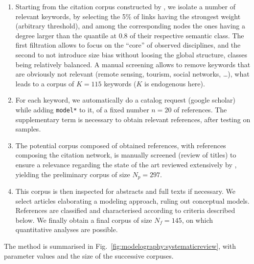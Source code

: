 \documentclass[10pt]{article}
\begin{document}
\begin{enumerate}
	\item Starting from the citation corpus constructed by \cite{raimbault2018caracterisation}, we isolate a number of relevant keywords, by selecting the 5\% of links having the strongest weight (arbitrary threshold), and among the corresponding nodes the ones having a degree larger than the quantile at 0.8 of their respective semantic class. The first filtration allows to focus on the ``core'' of observed disciplines, and the second to not introduce size bias without loosing the global structure, classes being relatively balanced. A manual screening allows to remove keywords that are obviously not relevant (remote sensing, tourism, social networks, \ldots), what leads to a corpus of $K=115$ keywords ($K$ is endogenous here).
	\item For each keyword, we automatically do a catalog request (google scholar) while adding \texttt{model*} to it, of a fixed number $n=20$ of references. The supplementary term is necessary to obtain relevant references, after testing on samples.
	\item The potential corpus composed of obtained references, with references composing the citation network, is manually screened (review of titles) to ensure a relevance regarding the state of the art reviewed extensively by \cite{raimbault2018caracterisation}, yielding the preliminary corpus of size $N_p = 297$.
	\item This corpus is then inspected for abstracts and full texts if necessary. We select articles elaborating a modeling approach, ruling out conceptual models. References are classified and characterised according to criteria described below. We finally obtain a final corpus of size $N_f = 145$, on which quantitative analyses are possible.
\end{enumerate}

The method is summarised in Fig.~\ref{fig:modelography:systematicreview}, with parameter values and the size of the successive corpuses.
\end{document}
